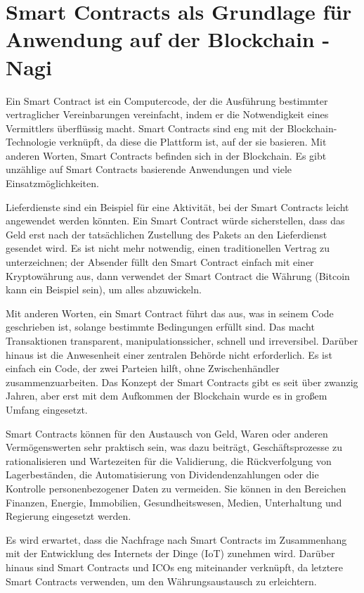 \section{Smart Contracts als Grundlage für Anwendung auf der Blockchain - Nagi}



Ein Smart Contract \cite{CW18} ist ein Computercode, der die Ausführung bestimmter vertraglicher Vereinbarungen vereinfacht, indem er die Notwendigkeit eines Vermittlers überflüssig macht. Smart Contracts sind eng mit der Blockchain-Technologie verknüpft, da diese die Plattform ist, auf der sie basieren. Mit anderen Worten, Smart Contracts befinden sich in der Blockchain. Es gibt unzählige auf Smart Contracts basierende Anwendungen und viele Einsatzmöglichkeiten.

Lieferdienste sind ein Beispiel für eine Aktivität, bei der Smart Contracts leicht angewendet werden könnten. Ein Smart Contract würde sicherstellen, dass das Geld erst nach der tatsächlichen Zustellung des Pakets an den Lieferdienst gesendet wird. Es ist nicht mehr notwendig, einen traditionellen Vertrag zu unterzeichnen; der Absender füllt den Smart Contract einfach mit einer Kryptowährung aus, dann verwendet der Smart Contract die Währung (Bitcoin kann ein Beispiel sein), um alles abzuwickeln.

Mit anderen Worten, ein Smart Contract führt das aus, was in seinem Code geschrieben ist, solange bestimmte Bedingungen erfüllt sind. Das macht Transaktionen transparent, manipulationssicher, schnell und irreversibel. Darüber hinaus ist die Anwesenheit einer zentralen Behörde nicht erforderlich. Es ist einfach ein Code, der zwei Parteien hilft, ohne Zwischenhändler zusammenzuarbeiten.
Das Konzept der Smart Contracts gibt es seit über zwanzig Jahren, aber erst mit dem Aufkommen der Blockchain wurde es in großem Umfang eingesetzt.

Smart Contracts können für den Austausch von Geld, Waren oder anderen Vermögenswerten sehr praktisch sein, was dazu beiträgt, Geschäftsprozesse zu rationalisieren und Wartezeiten für die Validierung, die Rückverfolgung von Lagerbeständen, die Automatisierung von Dividendenzahlungen oder die Kontrolle personenbezogener Daten zu vermeiden. Sie können in den Bereichen Finanzen, Energie, Immobilien, Gesundheitswesen, Medien, Unterhaltung und Regierung eingesetzt werden.

Es wird erwartet, dass die Nachfrage nach Smart Contracts im Zusammenhang mit der Entwicklung des Internets der Dinge (IoT) zunehmen wird. Darüber hinaus sind Smart Contracts und ICOs eng miteinander verknüpft, da letztere Smart Contracts verwenden, um den Währungsaustausch zu erleichtern.


